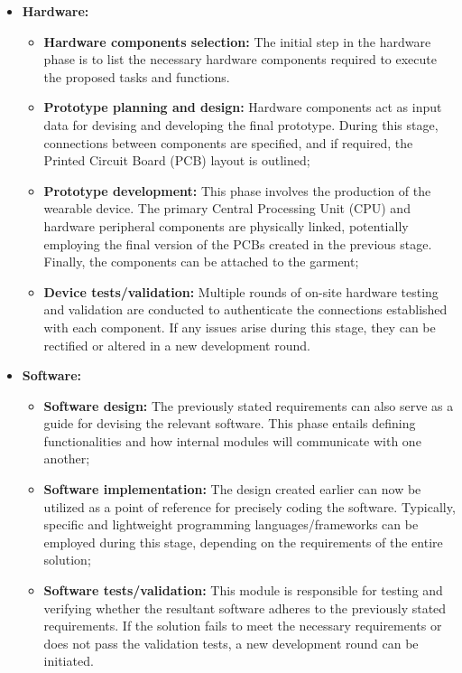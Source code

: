 \begin{itemize}
    \item \textbf{Hardware:} 
    \begin{itemize}
        \item \textbf{Hardware components selection:} The initial step in the hardware phase is to list the necessary hardware components required to execute the proposed tasks and functions.
        \item \textbf{Prototype planning and design:} Hardware components act as input data for devising and developing the final prototype. During this stage, connections between components are specified, and if required, the Printed Circuit Board (PCB) layout is outlined;
        \item \textbf{Prototype development:} This phase involves the production of the wearable device. The primary Central Processing Unit (CPU) and hardware peripheral components are physically linked, potentially employing the final version of the PCBs created in the previous stage. Finally, the components can be attached to the garment;
        \item \textbf{Device tests/validation:} Multiple rounds of on-site hardware testing and validation are conducted to authenticate the connections established with each component. If any issues arise during this stage, they can be rectified or altered in a new development round.
    \end{itemize}
    \item \textbf{Software:}
    \begin{itemize}
        \item \textbf{Software design:} The previously stated requirements can also serve as a guide for devising the relevant software. This phase entails defining functionalities and how internal modules will communicate with one another;
        \item \textbf{Software implementation:} The design created earlier can now be utilized as a point of reference for precisely coding the software. Typically, specific and lightweight programming languages/frameworks can be employed during this stage, depending on the requirements of the entire solution;
        \item \textbf{Software tests/validation:} This module is responsible for testing and verifying whether the resultant software adheres to the previously stated requirements. If the solution fails to meet the necessary requirements or does not pass the validation tests, a new development round can be initiated.
    \end{itemize}
\end{itemize}

